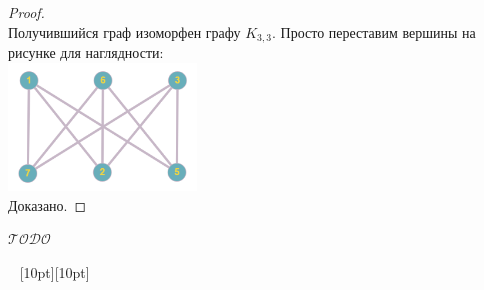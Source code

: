 \documentclass[a4paper,12pt]{article}
\theoremstyle{remark}
\def\iiTODO{\guillemotleft$\mathcal{TODO}$\guillemotright\textellipsis}
\begin{document}
\begin{proof}
	\\ Получившийся граф изоморфен графу $K_{3,3}$. Просто переставим вершины на рисунке для наглядности:
	\\ \includegraphics[width=5cm]{kuratovsky-task2-stage4.png}
	\\ Доказано.
\end{proof}


\iiTODO




\vspace{48pt} \noindent \hrulefill~ \raisebox{-8pt}[10pt][10pt]{\Huge{}}~ \hrulefill
\end{document}
